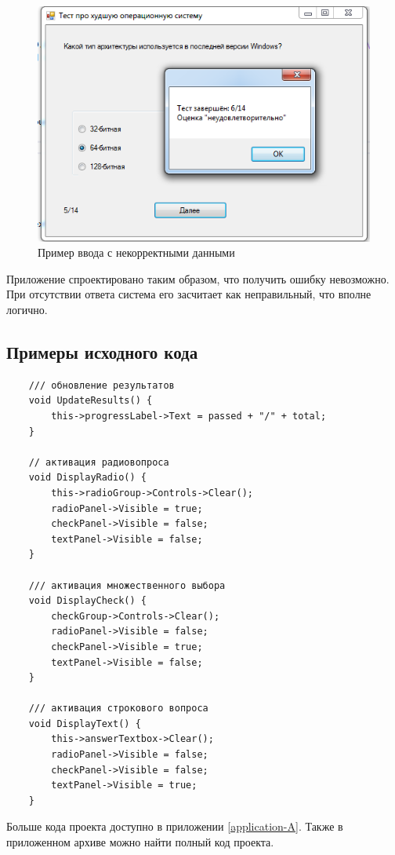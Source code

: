 \begin{figure}
\centering
\includegraphics[width=0.5\linewidth]{images//test/okay4.png}
\caption{Пример ввода с некорректными данными}
\label{fig:test-error}
\end{figure}

Приложение спроектировано таким образом, что получить ошибку невозможно. При отсутствии ответа система его засчитает как неправильный, что вполне логично.

\subsection{Примеры исходного кода}
\begin{verbatim}
	/// обновление результатов
	void UpdateResults() {
		this->progressLabel->Text = passed + "/" + total;
	}

	// активация радиовопроса
	void DisplayRadio() {
		this->radioGroup->Controls->Clear();
		radioPanel->Visible = true;
		checkPanel->Visible = false;
		textPanel->Visible = false;
	}

	/// активация множественного выбора
	void DisplayCheck() {
		checkGroup->Controls->Clear();
		radioPanel->Visible = false;
		checkPanel->Visible = true;
		textPanel->Visible = false;
	}

	/// активация строкового вопроса
	void DisplayText() {
		this->answerTextbox->Clear();
		radioPanel->Visible = false;
		checkPanel->Visible = false;
		textPanel->Visible = true;
	}
\end{verbatim}

Больше кода проекта доступно в приложении \ref{application-A}. Также в приложенном архиве можно найти полный код проекта.